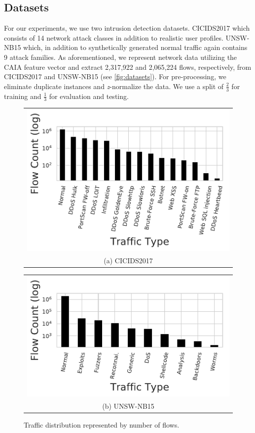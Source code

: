 \documentclass[conference]{IEEEtran}
\begin{document}
\subsection{Datasets}

For our experiments, we use two intrusion detection datasets. CICIDS2017 \cite{sharafaldin_toward_2018} which consists of 14 network attack classes in addition to realistic user profiles. UNSW-NB15 \cite{moustafa_unsw-nb15_2015} which, in addition to synthetically generated normal traffic again contains 9 attack families. As aforementioned, we represent network data utilizing the CAIA feature vector and extract 2,317,922 and 2,065,224 flows, respectively, from CICIDS2017 and UNSW-NB15 (see \autoref{fig:datasets}). For pre-processing, we eliminate duplicate instances and \emph{z}-normalize the data. We use a split of $\frac{2}{3}$ for training and $\frac{1}{3}$ for evaluation and testing.

\begin{figure}[H]
  \centering
  \begin{tabular}{@{}c@{}}
    \includegraphics[width=.8\linewidth]{figures/17_counts.pdf} \\[\abovecaptionskip]
    \small (a) CICIDS2017
  \end{tabular}

  \vspace{0.2cm}

  \begin{tabular}{@{}c@{}}
    \includegraphics[width=.8\linewidth]{figures/15_counts.pdf} \\[\abovecaptionskip]
    \small (b) UNSW-NB15
  \end{tabular}

  \caption{Traffic distribution represented by number of flows.}
  \label{fig:datasets}
\end{figure}
\end{document}
